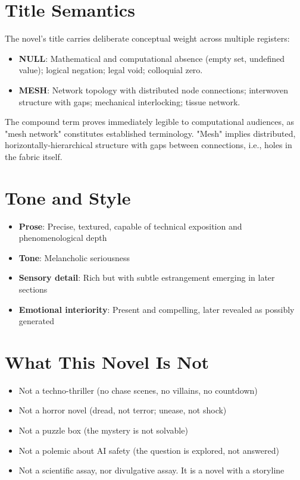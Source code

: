 \section*{Title Semantics}

The novel's title carries deliberate conceptual weight across multiple registers:

\begin{itemize}
    \item \textbf{NULL}: Mathematical and computational absence (empty set, undefined value); logical negation; legal void; colloquial zero. 
    \item \textbf{MESH}: Network topology with distributed node connections; interwoven structure with gaps; mechanical interlocking; tissue network. 
\end{itemize}

The compound term proves immediately legible to computational audiences, as "mesh network" constitutes established terminology. "Mesh" implies distributed, horizontally-hierarchical structure with gaps between connections, i.e., holes in the fabric itself.

\section*{Tone and Style}

\begin{itemize}
\item \textbf{Prose}: Precise, textured, capable of technical exposition and phenomenological depth
\item \textbf{Tone}: Melancholic seriousness
\item \textbf{Sensory detail}: Rich but with subtle estrangement emerging in later sections
\item \textbf{Emotional interiority}: Present and compelling, later revealed as possibly generated
\end{itemize}

\section*{What This Novel Is Not}

\begin{itemize}
\item Not a techno-thriller (no chase scenes, no villains, no countdown)
\item Not a horror novel (dread, not terror; unease, not shock)
\item Not a puzzle box (the mystery is not solvable)
\item Not a polemic about AI safety (the question is explored, not answered)
\item Not a scientific assay, nor divulgative assay. It is a novel with a storyline
\end{itemize}

